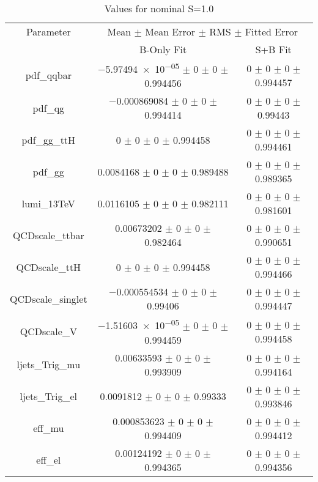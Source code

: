 \begin{table}
\centering
\caption{Values for nominal S=1.0}
\begin{tabular}{ccc}
\toprule
Parameter 	& \multicolumn{2}{c}{Mean $\pm$ Mean Error $\pm$ RMS $\pm$ Fitted Error}\\
 	& B-Only Fit & S+B Fit\\
\midrule
pdf\_qqbar 	& \num{-5.97494e-05} $\pm$ \num{0} $\pm$ \num{0} $\pm$ \num{0.994456} 	& \num{0} $\pm$ \num{0} $\pm$ \num{0} $\pm$ \num{0.994457}\\
pdf\_qg 	& \num{-0.000869084} $\pm$ \num{0} $\pm$ \num{0} $\pm$ \num{0.994414} 	& \num{0} $\pm$ \num{0} $\pm$ \num{0} $\pm$ \num{0.99443}\\
pdf\_gg\_ttH 	& \num{0} $\pm$ \num{0} $\pm$ \num{0} $\pm$ \num{0.994458} 	& \num{0} $\pm$ \num{0} $\pm$ \num{0} $\pm$ \num{0.994461}\\
pdf\_gg 	& \num{0.0084168} $\pm$ \num{0} $\pm$ \num{0} $\pm$ \num{0.989488} 	& \num{0} $\pm$ \num{0} $\pm$ \num{0} $\pm$ \num{0.989365}\\
lumi\_13TeV 	& \num{0.0116105} $\pm$ \num{0} $\pm$ \num{0} $\pm$ \num{0.982111} 	& \num{0} $\pm$ \num{0} $\pm$ \num{0} $\pm$ \num{0.981601}\\
QCDscale\_ttbar 	& \num{0.00673202} $\pm$ \num{0} $\pm$ \num{0} $\pm$ \num{0.982464} 	& \num{0} $\pm$ \num{0} $\pm$ \num{0} $\pm$ \num{0.990651}\\
QCDscale\_ttH 	& \num{0} $\pm$ \num{0} $\pm$ \num{0} $\pm$ \num{0.994458} 	& \num{0} $\pm$ \num{0} $\pm$ \num{0} $\pm$ \num{0.994466}\\
QCDscale\_singlet 	& \num{-0.000554534} $\pm$ \num{0} $\pm$ \num{0} $\pm$ \num{0.99406} 	& \num{0} $\pm$ \num{0} $\pm$ \num{0} $\pm$ \num{0.994447}\\
QCDscale\_V 	& \num{-1.51603e-05} $\pm$ \num{0} $\pm$ \num{0} $\pm$ \num{0.994459} 	& \num{0} $\pm$ \num{0} $\pm$ \num{0} $\pm$ \num{0.994458}\\
ljets\_Trig\_mu 	& \num{0.00633593} $\pm$ \num{0} $\pm$ \num{0} $\pm$ \num{0.993909} 	& \num{0} $\pm$ \num{0} $\pm$ \num{0} $\pm$ \num{0.994164}\\
ljets\_Trig\_el 	& \num{0.0091812} $\pm$ \num{0} $\pm$ \num{0} $\pm$ \num{0.99333} 	& \num{0} $\pm$ \num{0} $\pm$ \num{0} $\pm$ \num{0.993846}\\
eff\_mu 	& \num{0.000853623} $\pm$ \num{0} $\pm$ \num{0} $\pm$ \num{0.994409} 	& \num{0} $\pm$ \num{0} $\pm$ \num{0} $\pm$ \num{0.994412}\\
eff\_el 	& \num{0.00124192} $\pm$ \num{0} $\pm$ \num{0} $\pm$ \num{0.994365} 	& \num{0} $\pm$ \num{0} $\pm$ \num{0} $\pm$ \num{0.994356}\\

\end{tabular}
\end{table}
